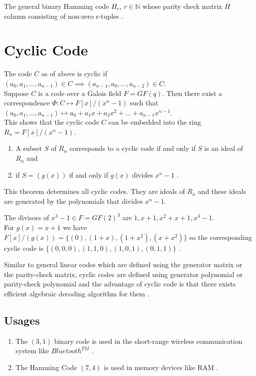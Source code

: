 \begin{example}
  The general binary Hamming code \(H_r\), \(r \in \mathbb{N}\) whose parity check matrix \(H\) column consisting of non-zero r-tuples \cite{error_correct}.
\end{example}

\section{Cyclic Code}
The code \(C\) as of above is cyclic if \((a_0,a_1,...,a_{n-1}) \in C \implies (a_{n-1},a_0,...,a_{n-2}) \in C\).\\

Suppose \(C\) is a code over a Galois field \(F=GF(q)\). Then there exist a correspondence \(\Phi : C \mapsto F[x]/(x^n-1)\) such that \((a_0,a_1,...,a_{n-1})\longmapsto a_0+a_1x+a_2x^2+...+a_{n-1}x^{n-1}\).\\
This shows that the cyclic code \(C\) can be embedded into the ring \(R_n=F[x]/(x^n-1)\).

\begin{theorem}
  \begin{enumerate}
  \item A subset \(S\) of \(R_n\) corresponds to a cyclic code if and only if \(S\) is an ideal of \(R_n\) and
  \item if \(S=(g(x))\) if and only if  \(g(x)\) divides \(x^n-1\) \cite{error_correct}.
  \end{enumerate}
\end{theorem}

This theorem determines all cyclic codes. They are ideals of \(R_n\) and these ideals are generated by the polynomials that divides \(x^n-1\).

\begin{example}
  The divisors of \(x^3-1 \in F=GF(2)^{3}\) are \(1, x+1, x^2+x+1, x^3-1\).\\
  For \(g(x)=x+1\) we have \(F[x]/(g(x))=\{(0),(1+x),(1+x^2),(x+x^2)\}\) so the corresponding cyclic code is \(\{(0,0,0),(1,1,0),(1,0,1),(0,1,1)\}\) \cite{error_correct}.
\end{example}

\vspace{5mm}
Similar to general linear codes which are defined using the generator matrix or the parity-check matrix, cyclic codes are defined using generator polynomial or parity-check polynomial and the advantage of cyclic code is that there exists efficient algebraic decoding algorithm for them \cite{coding}.

\subsection{Usages}
\begin{enumerate}
\item The \((3,1)\) binary code is used in the short-range wireless communication system like \(Bluetooth^{TM}\) \cite{wireless}.
  \item The Hamming Code \((7,4)\) is used in memory devices like RAM \cite{coding}.
\end{enumerate}
